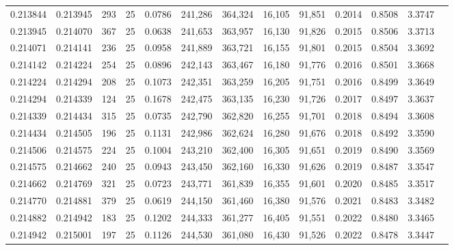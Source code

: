 \begin{tabular}{rrrrrrrrrrrrr}
0.213844 & 0.213945 &   293 &  25 &                                     0.0786 & 241,286 & 364,324 &  16,105 &  91,851 & 0.2014 & 0.8508 & 3.3747 \\
0.213945 & 0.214070 &   367 &  25 &                                     0.0638 & 241,653 & 363,957 &  16,130 &  91,826 & 0.2015 & 0.8506 & 3.3713 \\
0.214071 & 0.214141 &   236 &  25 &                                     0.0958 & 241,889 & 363,721 &  16,155 &  91,801 & 0.2015 & 0.8504 & 3.3692 \\
0.214142 & 0.214224 &   254 &  25 &                                     0.0896 & 242,143 & 363,467 &  16,180 &  91,776 & 0.2016 & 0.8501 & 3.3668 \\
0.214224 & 0.214294 &   208 &  25 &                                     0.1073 & 242,351 & 363,259 &  16,205 &  91,751 & 0.2016 & 0.8499 & 3.3649 \\
0.214294 & 0.214339 &   124 &  25 &                                     0.1678 & 242,475 & 363,135 &  16,230 &  91,726 & 0.2017 & 0.8497 & 3.3637 \\
0.214339 & 0.214434 &   315 &  25 &                                     0.0735 & 242,790 & 362,820 &  16,255 &  91,701 & 0.2018 & 0.8494 & 3.3608 \\
0.214434 & 0.214505 &   196 &  25 &                                     0.1131 & 242,986 & 362,624 &  16,280 &  91,676 & 0.2018 & 0.8492 & 3.3590 \\
0.214506 & 0.214575 &   224 &  25 &                                     0.1004 & 243,210 & 362,400 &  16,305 &  91,651 & 0.2019 & 0.8490 & 3.3569 \\
0.214575 & 0.214662 &   240 &  25 &                                     0.0943 & 243,450 & 362,160 &  16,330 &  91,626 & 0.2019 & 0.8487 & 3.3547 \\
0.214662 & 0.214769 &   321 &  25 &                                     0.0723 & 243,771 & 361,839 &  16,355 &  91,601 & 0.2020 & 0.8485 & 3.3517 \\
0.214770 & 0.214881 &   379 &  25 &                                     0.0619 & 244,150 & 361,460 &  16,380 &  91,576 & 0.2021 & 0.8483 & 3.3482 \\
0.214882 & 0.214942 &   183 &  25 &                                     0.1202 & 244,333 & 361,277 &  16,405 &  91,551 & 0.2022 & 0.8480 & 3.3465 \\
0.214942 & 0.215001 &   197 &  25 &                                     0.1126 & 244,530 & 361,080 &  16,430 &  91,526 & 0.2022 & 0.8478 & 3.3447 \\

\end{tabular}
